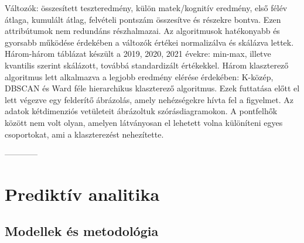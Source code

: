 \documentclass[12pt]{article}
\begin{document}
Változók: összesített teszteredmény, külön matek/kognitív eredmény, első félév átlaga, kumulált átlag, felvételi pontszám összesítve és részekre bontva. Ezen attribútumok nem redundáns részhalmazai.
	Az algoritmusok hatékonyabb és gyorsabb működése érdekében a változók értékei normalizálva és skálázva lettek. Három-három táblázat készült a 2019, 2020, 2021 évekre: min-max, illetve kvantilis szerint skálázott, továbbá standardizált értékekkel.
	Három klaszterező algoritmus lett alkalmazva a legjobb eredmény elérése érdekében: K-közép, DBSCAN és Ward féle hierarchikus klaszterező algoritmus.
	Ezek futtatása előtt el lett végezve egy felderítő ábrázolás, amely nehézségekre hívta fel a figyelmet. Az adatok kétdimenziós vetületeit ábrázoltuk szórásdiagramokon. A pontfelhők között nem volt olyan, amelyen látványosan el lehetett volna különíteni egyes csoportokat, ami a klaszterezést nehezítette.

------------

\newpage
\section{Prediktív analitika}

\subsection{Modellek és metodológia}
\end{document}
